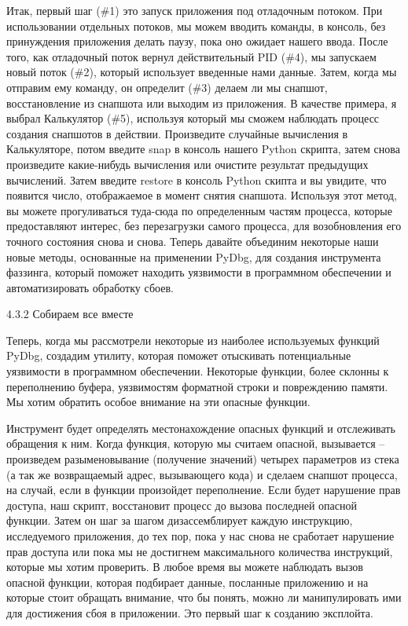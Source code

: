 \documentclass[12pt]{book}
\begin{document}
Итак, первый шаг (\#1) это запуск приложения под отладочным потоком. При использовании отдельных потоков, мы можем вводить команды, в консоль, без принуждения приложения делать паузу, пока оно ожидает нашего ввода. После того, как отладочный поток вернул действительный PID (\#4), мы запускаем новый поток (\#2), который использует введенные нами данные. Затем, когда мы отправим ему команду, он определит (\#3) делаем ли мы снапшот, восстановление из снапшота или выходим из приложения. В качестве примера, я выбрал Калькулятор (\#5), используя который мы сможем наблюдать процесс создания снапшотов в действии. Произведите случайные вычисления в Калькуляторе, потом введите snap в консоль нашего Python скрипта, затем снова произведите какие-нибудь вычисления или очистите результат предыдущих вычислений. Затем введите restore в консоль Python скипта и вы увидите, что появится число, отображаемое в момент снятия снапшота. Используя этот метод, вы можете прогуливаться туда-сюда по определенным частям процесса, которые предоставляют интерес, без перезагрузки самого процесса, для возобновления его точного состояния снова и снова. Теперь давайте объединим некоторые наши новые методы, основанные на применении PyDbg, для создания инструмента фаззинга, который поможет находить уязвимости в программном обеспечении и автоматизировать обработку сбоев.

4.3.2 Собираем все вместе

Теперь, когда мы рассмотрели некоторые из наиболее используемых функций PyDbg, создадим утилиту, которая поможет отыскивать потенциальные уязвимости в программном обеспечении. Некоторые функции, более склонны к переполнению буфера, уязвимостям форматной строки и повреждению памяти. Мы хотим обратить особое внимание на эти опасные функции.

Инструмент будет определять местонахождение опасных функций и отслеживать обращения к ним. Когда функция, которую мы считаем опасной, вызывается – произведем разыменовывание (получение значений) четырех параметров из стека (а так же возвращаемый адрес, вызывающего кода) и сделаем снапшот процесса, на случай, если в функции произойдет переполнение. Если будет нарушение прав доступа, наш скрипт, восстановит процесс до вызова последней опасной функции. Затем он шаг за шагом дизассемблирует каждую инструкцию, исследуемого приложения, до тех пор, пока у нас снова не сработает нарушение прав доступа или пока мы не достигнем максимального количества инструкций, которые мы хотим проверить. В любое время вы можете наблюдать вызов опасной функции, которая подбирает данные, посланные приложению и на которые стоит обращать внимание, что бы понять, можно ли манипулировать ими для достижения сбоя в приложении. Это первый шаг к созданию эксплойта.
\end{document}
